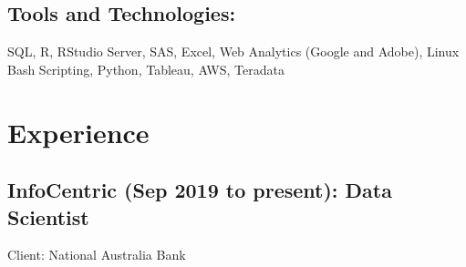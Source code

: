 \documentclass{article}
\begin{document}
\subsection{Tools and Technologies:}
SQL, R, RStudio Server, SAS, Excel, Web Analytics (Google and Adobe), Linux Bash Scripting, Python, Tableau, AWS, Teradata

\section{Experience}

\subsection{InfoCentric (Sep 2019 to present): Data Scientist}
Client: National Australia Bank
\end{document}
